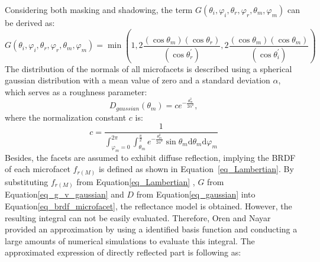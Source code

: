 Considering both masking and shadowing,  the term $G(\theta_i, \varphi_i, \theta_r, \varphi_r, \theta_m, \varphi_m)$ can be derived as:
\begin{equation}
    \label{eq_g_v_gaussian}
    G(\theta_i, \varphi_i, \theta_r, \varphi_r, \theta_m, \varphi_m) = \min\left(
    1, %
    2\frac{(\cos\theta_m)(\cos\theta_r)}{(\cos\theta_r^\prime)},%
    2\frac{(\cos\theta_m)(\cos\theta_m)}{(\cos\theta_i^\prime)}
    \right)
\end{equation}
The distribution of the normals of all microfacets is described using a spherical gaussian distribution with a mean value of zero and a standard deviation $\alpha$, which serves as a roughness parameter:
\begin{equation}
    \label{eq_gaussian}
    D_{gaussian}(\theta_m) = c e^{-\frac{\theta_m^2}{2\alpha^2}},
\end{equation}
where the normalization constant $c$ is:
\[
    c = \frac{1}{\displaystyle{\int_{\varphi_m=0}^{2\pi} \int_{\theta_m}^{\frac{\pi}{2}} e^{-\frac{\theta_m^2}{2\alpha^2}}\sin\theta_m \mathrm{d}\theta_m \mathrm{d}\varphi_m}}
\]
Besides, the facets are assumed to exhibit diffuse reflection, implying the BRDF of each microfacet $f_{r(M)}$ is defined as shown in Equation~\eqref{eq_Lambertian}.
By substituting $f_{r(M)}$ from Equation\eqref{eq_Lambertian} , $G$ from Equation\eqref{eq_g_v_gaussian} and $D$ from Equation\eqref{eq_gaussian} into Equation\eqref{eq_brdf_microfacet}, the reflectance model is obtained.
However, the resulting integral can not be easily evaluated.
Therefore, Oren and Nayar provided an approximation by using a identified basis function and conducting a large amounts of numerical simulations to evaluate this integral.
The approximated expression of directly reflected part is following as:
